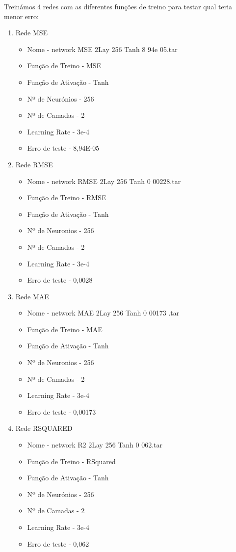 \documentclass[10pt]{article}
\begin{document}
\vspace{1cm}
Treinámos 4 redes com as diferentes funções de treino para testar qual teria menor erro:  
\vspace{1cm}
\begin{enumerate}
\item Rede MSE
  \begin{itemize}
    \item Nome - network MSE 2Lay 256 Tanh 8 94e 05.tar
    \item Função de Treino - MSE
    \item Função de Ativação - Tanh
    \item Nº de Neurónios - 256
    \item Nº de Camadas - 2
    \item Learning Rate - 3e-4
    \item Erro de teste - 8,94E-05
  \end{itemize}
  \vspace{2cm}
  \item Rede RMSE
  \begin{itemize}
    \item Nome - network RMSE 2Lay 256 Tanh 0 00228.tar
    \item Função de Treino - RMSE
    \item Função de Ativação - Tanh
    \item Nº de Neuronios - 256
    \item Nº de Camadas - 2
    \item Learning Rate - 3e-4
    \item Erro de teste - 0,0028
  \end{itemize}  
  \vspace{2cm}
  \item Rede MAE
  \begin{itemize} 
    \item Nome - network MAE 2Lay 256 Tanh 0 00173 .tar
    \item Função de Treino - MAE
    \item Função de Ativação - Tanh
    \item Nº de Neuronios - 256
    \item Nº de Camadas - 2
    \item Learning Rate - 3e-4
    \item Erro de teste - 0,00173
  \end{itemize}
  \vspace{2cm}
  \item Rede RSQUARED
  \begin{itemize}
    \item Nome - network R2 2Lay 256 Tanh 0 062.tar
    \item Função de Treino - RSquared
    \item Função de Ativação - Tanh
    \item Nº de Neurónios - 256
    \item Nº de Camadas - 2
    \item Learning Rate - 3e-4
    \item Erro de teste - 0,062   
  \end{itemize}
\end{enumerate}
\end{document}
